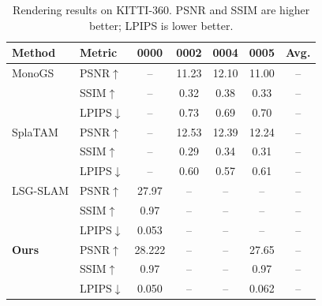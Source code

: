 \begin{table}[t]
\caption{Rendering results on KITTI-360. PSNR and SSIM are higher better; LPIPS is lower better.}
\label{tab:kitti360_mapping}
\centering
\footnotesize
\setlength{\tabcolsep}{8pt}
\begin{tabular}{llccccc}
\toprule
Method & Metric & 0000 & 0002 & 0004 & 0005 & Avg. \\
\midrule
MonoGS & PSNR$\uparrow$ & -- & 11.23 & 12.10 & 11.00 & -- \\
 & SSIM$\uparrow$ & -- & 0.32 & 0.38 & 0.33 & -- \\
 & LPIPS$\downarrow$ & -- & 0.73 & 0.69 & 0.70 & -- \\
\midrule
SplaTAM & PSNR$\uparrow$ & -- & 12.53 & 12.39 & 12.24 & -- \\
 & SSIM$\uparrow$ & -- & 0.29 & 0.34 & 0.31 & -- \\
 & LPIPS$\downarrow$ & -- & 0.60 & 0.57 & 0.61 & -- \\
\midrule
LSG-SLAM & PSNR$\uparrow$ & 27.97 & -- & -- & -- & -- \\
 & SSIM$\uparrow$ & 0.97 & -- & -- & -- & -- \\
 & LPIPS$\downarrow$ & 0.053 & -- & -- & -- & -- \\
\midrule
\textbf{Ours} & PSNR$\uparrow$ & 28.222 & -- & -- & 27.65 & -- \\
 & SSIM$\uparrow$ & 0.97 & -- & -- & 0.97 & -- \\
 & LPIPS$\downarrow$ & 0.050 & -- & -- & 0.062 & -- \\
\bottomrule
\end{tabular}
\end{table}
